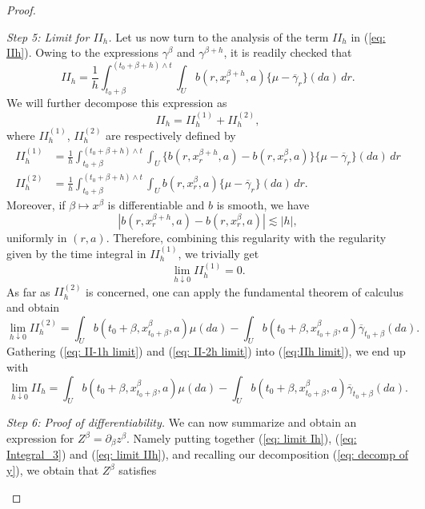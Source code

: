 \documentclass[10pt,a4paper]{amsart}
\newcommand{\ga}{\gamma}
\begin{document}
\begin{proof}
\begin{enumerate}[wide, labelwidth=!, labelindent=0pt, label=\emph{(\roman*)}]
\smallskip
\noindent
\textit{Step 5: Limit for $II_{h}$.} 
Let us now turn to the analysis of the term $II_{h}$ in (\ref{eq: IIh}). Owing to the expressions $\ga^{\beta}$ and $\ga^{\beta+h}$, it is readily checked that 
\[II_{h}=\frac{1}{h}\int_{t_{0}+\beta}^{(t_{0}+\beta+h)\wedge t}\int_{U}b(r,x_{r}^{\beta+h},a)\{\mu-\overline{\ga}_{r}\}(da)\,dr.\]
We will further decompose this expression as 
\begin{equation}\label{eq:IIh limit}
    II_{h}=II_{h}^{(1)}+II_{h}^{(2)},
\end{equation}
where $II_{h}^{(1)}$, $II_{h}^{(2)}$ are respectively defined by
\begin{align}
    II_{h}^{(1)}&=\frac{1}{h}\int_{t_{0}+\beta}^{(t_{0}+\beta+h)\wedge t}\int_{U}\{b(r,x_{r}^{\beta+h},a)-b(r,x_{r}^{\beta},a)\}\{\mu-\overline{\ga}_{r}\}(da)\,dr\\
    II_{h}^{(2)}&=\frac{1}{h}\int_{t_{0}+\beta}^{(t_{0}+\beta+h)\wedge t}\int_{U}b(r,x_{r}^{\beta},a)\{\mu-\overline{\ga}_{r}\}(da)\,dr.
\end{align}
Moreover, if $\beta\mapsto x^{\beta}$ is differentiable and $b$ is smooth, we have
\[|b(r,x_{r}^{\beta+h},a)-b(r,x_{r}^{\beta},a)|\lesssim|h|,\]
uniformly in $(r,a)$. Therefore, combining this regularity with the regularity given by the time integral in $II_{h}^{(1)}$, we trivially  get
\begin{equation}\label{eq: II-1h limit}
    \lim_{h\downarrow 0}II_{h}^{(1)}=0.
\end{equation}
As far as $II_{h}^{(2)}$ is concerned, one can apply the fundamental theorem of calculus and obtain
\begin{equation}\label{eq: II-2h limit}
    \lim_{h\downarrow 0}II_{h}^{(2)}= \int_{U}b(t_{0}+\beta,x^{\beta}_{t_{0}+\beta},a)\mu(da)-\int_{U}b(t_{0}+\beta,x^{\beta}_{t_{0}+\beta},a)\overline{\ga}_{t_{0}+\beta}(da).
\end{equation}
Gathering (\ref{eq: II-1h limit}) and (\ref{eq: II-2h limit}) into (\ref{eq:IIh limit}), we end up with
\begin{equation}\label{eq: limit IIh}
    \lim_{h\downarrow 0} II_{h}=\int_{U}b(t_{0}+\beta,x^{\beta}_{t_{0}+\beta},a)\mu(da)-\int_{U}b(t_{0}+\beta,x^{\beta}_{t_{0}+\beta},a)\overline{\ga}_{t_{0}+\beta}(da).
\end{equation}

\smallskip
\noindent
\textit{Step 6: Proof of differentiability.} \label{lem 3.8: step 6}
We can now summarize and obtain an expression for $Z^{\beta}=\partial_{\beta}z^{\beta}$. Namely putting together (\ref{eq: limit Ih}), (\ref{eq: Integral_3}) and (\ref{eq: limit IIh}), and recalling our decomposition (\ref{eq: decomp of y}), we obtain that $Z^{\beta}$ satisfies


\end{enumerate}
\end{proof}
\end{document}
